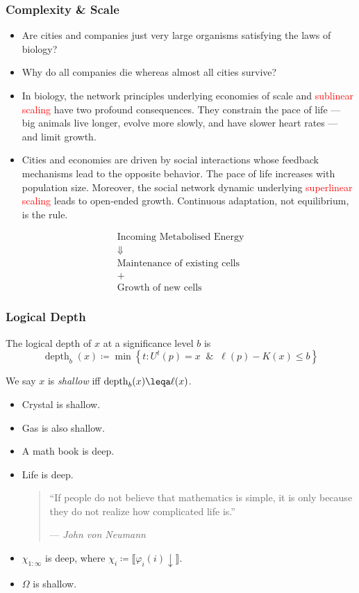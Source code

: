 \documentclass[UTF8,11pt,colorlinks,compress,openany]{beamer}%
\begin{document}
\begin{frame}\frametitle{Complexity \& Scale}
\begin{itemize}
	\item Are cities and companies just very large organisms satisfying the laws of biology?
	\item Why do all companies die whereas almost all cities survive?
\end{itemize}
\begin{itemize}
	\item In biology, the network principles underlying economies of scale and \textcolor{red}{sublinear scaling} have two profound consequences. They constrain the pace of life --- big animals live longer, evolve more slowly, and have slower heart rates --- and limit growth.
	\item Cities and economies are driven by social interactions whose feedback mechanisms lead to the opposite behavior. The pace of life increases with population size. Moreover, the social network dynamic underlying \textcolor{red}{superlinear scaling} leads to open-ended growth. Continuous adaptation, not equilibrium, is the rule.
\end{itemize}
\[
\begin{matrix}
	\text{Incoming Metabolised Energy}\\
	\Downarrow\\
	\text{Maintenance of existing cells}\\
	+\\
	\text{Growth of new cells}
\end{matrix}
\]
\end{frame}

\begin{frame}\frametitle{Logical Depth}
\begin{definition}
The logical depth of $x$ at a significance level $b$ is
\[\operatorname{depth}_b(x)\coloneqq \min\left\{t: U^t(p)=x\;\;\&\;\;\ell(p)-K(x)\leq b\right\}\]
\end{definition}
We say $x$ is \emph{shallow} iff $\operatorname{depth}_b(x)\leqa\ell(x)$.

\begin{itemize}
	\item Crystal is shallow.
	\item Gas is also shallow.
	\item A math book is deep.
	\item Life is deep.
	\begin{quote}
		``If people do not believe that mathematics is simple, it is only because they do not realize how complicated life is.''\par \hfill --- \textsl{John von Neumann}
	\end{quote}
	\item $\chi_{1:\infty}$ is deep, where $\chi_i\coloneqq \llbracket\varphi_i(i)\downarrow\rrbracket$.
	\item $\Omega$ is shallow.
\end{itemize}
\end{frame}
\end{document}
